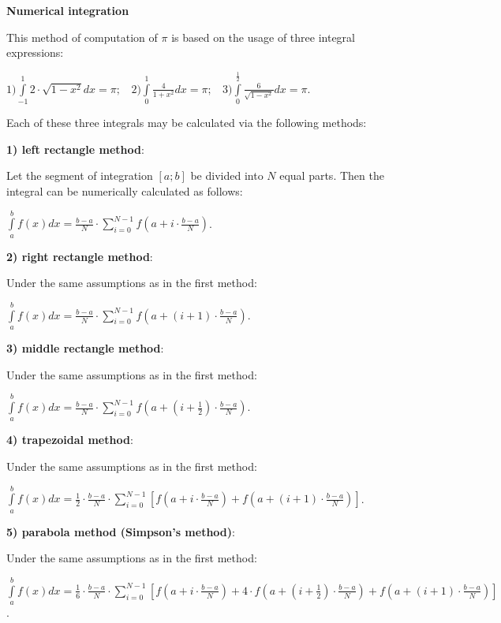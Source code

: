 \documentclass[12pt]{article}
\begin{document}
\begin{titlepage}
\begin{center}
	\large\textbf{Numerical integration}
\end{center}
\scriptsize
This method of computation of $\pi$ is based on the usage of three integral expressions:
\begin{flushleft}
	$1)\int\limits_{-1}^{1} 2\cdot\sqrt{1-x^{2}} dx=\pi;\;\;$
    $2)\int\limits_{0}^{1} \frac{4}{1+x^{2}} dx = \pi;\;\;$
	$3)\int\limits_{0}^{\frac{1}{2}} \frac{6}{\sqrt{1-x^{2}}} dx = \pi.$

Each of these three integrals may be calculated via the following methods:

\textbf{1) left rectangle method}:

Let the segment of integration $[a; b]$ be divided into $N$ equal parts. Then the integral can be numerically calculated as follows:

$\int\limits_{a}^{b} f(x)dx=\frac{b-a}{N}\cdot\displaystyle\sum_{i=0}^{N-1} f\left(a+i\cdot\frac{b-a}{N}\right)$.

\textbf{2) right rectangle method}:

Under the same assumptions as in the first method:

$\int\limits_{a}^{b} f(x)dx=\frac{b-a}{N}\cdot\displaystyle\sum_{i=0}^{N-1} f\left(a+\left(i+1\right)\cdot\frac{b-a}{N}\right)$.

\textbf{3) middle rectangle method}:

Under the same assumptions as in the first method:

$\int\limits_{a}^{b} f(x)dx=\frac{b-a}{N}\cdot\displaystyle\sum_{i=0}^{N-1} f\left(a+\left(i+\frac{1}{2}\right)\cdot\frac{b-a}{N}\right)$.

\textbf{4) trapezoidal method}:

Under the same assumptions as in the first method:

$\int\limits_{a}^{b} f(x)dx=\frac{1}{2}\cdot\frac{b-a}{N}\cdot\displaystyle\sum_{i=0}^{N-1}\left[ f\left(a+i\cdot\frac{b-a}{N}\right)+f\left(a+\left(i+1\right)\cdot\frac{b-a}{N}\right)\right]$.

\textbf{5) parabola method (Simpson's method)}:

Under the same assumptions as in the first method:

$\int\limits_{a}^{b} f(x)dx=\frac{1}{6}\cdot\frac{b-a}{N}\cdot\displaystyle\sum_{i=0}^{N-1}\left[ f\left(a+i\cdot\frac{b-a}{N}\right)+4\cdot f\left(a+\left(i+\frac{1}{2}\right)\cdot\frac{b-a}{N}\right)+f\left(a+\left(i+1\right)\cdot\frac{b-a}{N}\right)\right]$.


\end{flushleft}
\end{titlepage}
\end{document}
